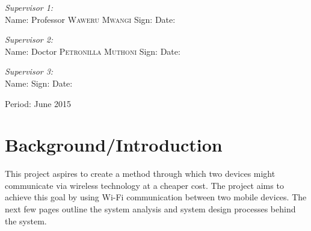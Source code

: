 \documentclass[12pt,svgnames,smaller]{article} %
\begin{document}
\begin{titlepage}
		\begin{minipage}{1.0\textwidth}
			\begin{flushleft} \large
				\emph{Supervisor 1:} \\
				Name: Professor \textsc{Waweru Mwangi} Sign: \hrulefill Date: \hrulefill
			\end{flushleft}
		\end{minipage}
		
		\begin{minipage}{1.0\textwidth}
			\begin{flushleft} \large
				\emph{Supervisor 2:} \\
				Name: Doctor \textsc{Petronilla Muthoni} Sign: \hrulefill Date: \hrulefill
			\end{flushleft}
		\end{minipage}
		
		\begin{minipage}{1.0\textwidth}
			\begin{flushleft} \large
				\emph{Supervisor 3:} \\
				Name: \hrulefill Sign: \hrulefill Date: \hrulefill
			\end{flushleft}
		\end{minipage}
		
		\vfill
		
		
		\begin{center}
			{\large Period: June 2015}
		\end{center}
	\end{titlepage}
	
	
	\clearpage

	\tableofcontents
	\clearpage
				
	
	\section{\textbf{Background/Introduction}}
	
	This project aspires to create a method through which two devices might communicate via wireless technology at a cheaper cost. The project aims to achieve this goal by using Wi-Fi communication between two mobile devices. The next few pages outline the system analysis and system design processes behind the system.
	
\end{document}
